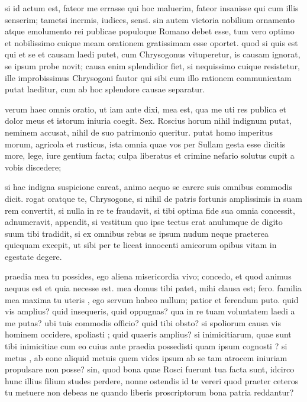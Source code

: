  si id actum est, fateor me errasse qui hoc maluerim, fateor insanisse qui cum illis senserim; tametsi inermis, iudices, sensi. sin autem victoria nobilium ornamento atque emolumento rei publicae populoque Romano debet esse, tum vero optimo et nobilissimo cuique meam orationem gratissimam esse oportet. quod si quis est qui et se et causam laedi putet, cum Chrysogonus vituperetur, is causam ignorat, se ipsum probe novit; causa enim splendidior fiet, si nequissimo cuique resistetur, ille improbissimus Chrysogoni fautor qui sibi cum illo rationem communicatam putat laeditur, cum ab hoc splendore causae separatur.

 verum haec omnis oratio, ut iam ante dixi, mea est, qua me uti res publica et dolor meus et istorum iniuria coegit. Sex. Roscius horum nihil indignum putat, neminem accusat, nihil de suo patrimonio queritur. putat homo imperitus morum, agricola et rusticus, ista omnia quae vos per Sullam gesta esse dicitis more, lege, iure gentium facta; culpa liberatus et crimine nefario solutus cupit a vobis discedere;

 si hac indigna suspicione careat, animo aequo se carere suis omnibus commodis dicit. rogat oratque te, Chrysogone, si nihil de patris fortunis amplissimis in suam rem convertit, si nulla in re te fraudavit, si tibi optima fide sua omnia concessit, adnumeravit, appendit, si vestitum quo ipse tectus erat anulumque de digito suum tibi tradidit, si ex omnibus rebus se ipsum nudum neque praeterea quicquam excepit, ut sibi per te liceat innocenti amicorum opibus vitam in egestate degere.

 praedia mea tu possides, ego aliena misericordia vivo; concedo, et quod animus aequus est et quia necesse est. mea domus tibi patet, mihi clausa est; fero. familia mea maxima tu uteris , ego servum habeo nullum; patior et ferendum puto. quid vis amplius? quid insequeris, quid oppugnas? qua in re tuam voluntatem laedi a me putas? ubi tuis commodis officio? quid tibi obsto? si spoliorum causa vis hominem occidere, spoliasti ; quid quaeris amplius? si inimicitiarum, quae sunt tibi inimicitiae cum eo cuius ante praedia possedisti quam ipsum cognosti ? si metus , ab eone aliquid metuis quem vides ipsum ab se tam atrocem iniuriam propulsare non posse? sin, quod bona quae Rosci fuerunt tua facta sunt, idcirco hunc illius filium studes perdere, nonne ostendis id te vereri quod praeter ceteros tu metuere non debeas ne quando liberis proscriptorum bona patria reddantur?

